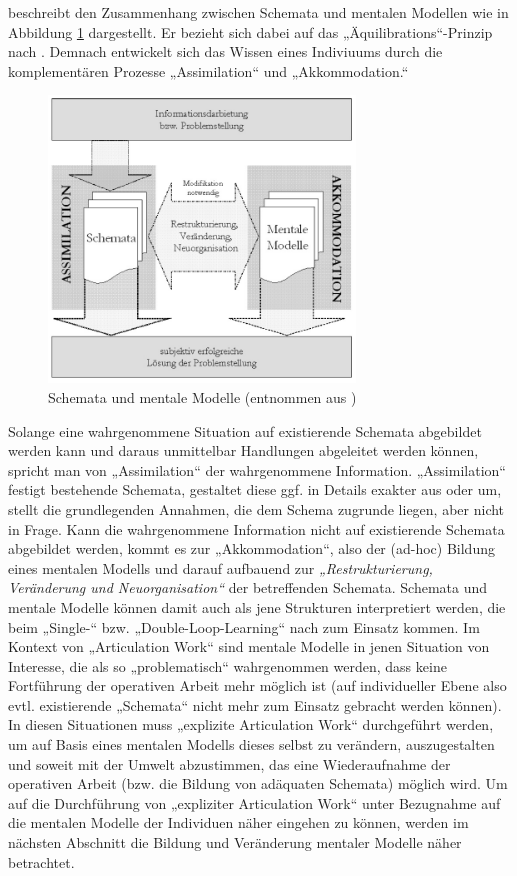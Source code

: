 \citet{Ifenthaler06} beschreibt den Zusammenhang zwischen Schemata und mentalen Modellen wie in Abbildung \ref{fig:img_MentaleModelle_iffenthaler_assimilation_akkommodation} dargestellt. Er bezieht sich dabei auf das „Äquilibrations“-Prinzip nach \citet{Piaget76}. Demnach entwickelt sich das Wissen eines Indiviuums durch die komplementären Prozesse „Assimilation“ und „Akkommodation.“

\begin{figure}[htbp]
	\centering		\includegraphics[height=3in]{img/MentaleModelle/iffenthaler_assimilation_akkommodation.png}
	\caption[Schemata und mentale Modelle]{Schemata und mentale Modelle (entnommen aus \citet[][S. 10]{Ifenthaler06})}
	\label{fig:img_MentaleModelle_iffenthaler_assimilation_akkommodation}
\end{figure}

Solange \wichtig eine wahrgenommene Situation auf existierende Schemata abgebildet werden kann und daraus unmittelbar Handlungen abgeleitet werden können, spricht man von „Assimilation“ der wahrgenommene Information. „Assimilation“ festigt bestehende Schemata, gestaltet diese ggf. in Details exakter aus oder um, stellt die grundlegenden Annahmen, die dem Schema zugrunde liegen, aber nicht in Frage. Kann die wahrgenommene Information nicht auf existierende Schemata abgebildet werden, kommt es zur „Akkommodation“, also der (ad-hoc) Bildung eines mentalen Modells und darauf aufbauend zur \emph{„Restrukturierung, Veränderung und Neuorganisation“} \citep{Ifenthaler06} der betreffenden Schemata. Schemata und mentale Modelle können damit auch als jene Strukturen interpretiert werden, die beim „Single-“ bzw. „Double-Loop-Learning“ nach \citet{Argyris78} zum Einsatz kommen. Im Kontext von „Articulation Work“ sind mentale Modelle in jenen Situation von Interesse, die als so „problematisch“ wahrgenommen werden, dass keine Fortführung der operativen Arbeit mehr möglich ist (auf individueller Ebene also evtl. existierende „Schemata“ nicht mehr zum Einsatz gebracht werden können). In diesen Situationen muss „explizite Articulation Work“ durchgeführt werden, um auf Basis eines mentalen Modells dieses selbst zu verändern, auszugestalten und soweit mit der Umwelt abzustimmen, das eine Wiederaufnahme der operativen Arbeit (bzw. die Bildung von adäquaten Schemata) möglich wird. Um auf die Durchführung von „expliziter Articulation Work“ unter Bezugnahme auf die mentalen Modelle der Individuen näher eingehen zu können, werden im nächsten Abschnitt die Bildung und Veränderung mentaler Modelle näher betrachtet.

